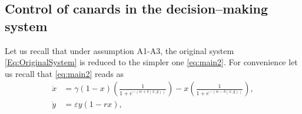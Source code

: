 \documentclass[3p]{elsarticle}
\theoremstyle{plain}
\theoremstyle{remark}
\theoremstyle{definition}
\begin{document}
    \subsection{Control of canards in the decision--making system}
    \label{SubSec:MaxStock}

    Let us recall that under assumption A1-A3, the original system \eqref{Eq:OriginalSystem} is reduced to the simpler one \eqref{eq:main2}. For convenience let us recall that \eqref{eq:main2} reads as
    \begin{subequations}
    \renewcommand{\theequation}{\theparentequation.\arabic{equation}}
    \begin{align}
            \dot{x} &= \gamma(1-x)\left( \frac{1}{1+e^{-(\alpha + \delta(x,y))}} \right) - x\left( \frac{1}{1+e^{-(\alpha-\delta(x,y))}} \right),\label{Eq:SimplifiedSystem_Fast}\\
            \dot{y} &= \varepsilon y (1-rx),\label{Eq:SimplifiedSystem_Slow}
    \end{align}
    \label{Eq:SimplifiedSystem}
    \end{subequations}
    
    
    
\end{document}
